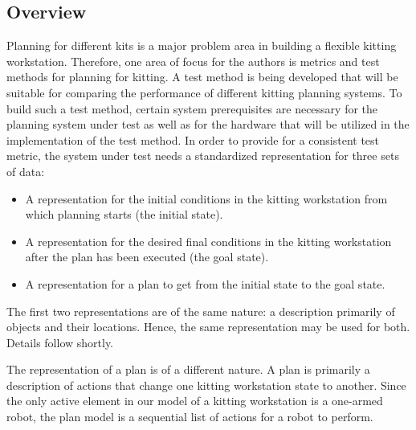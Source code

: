 \subsection{Overview}
Planning for different kits is a major problem area in building a
flexible kitting workstation. Therefore, one area of focus for the
authors is metrics and test methods for planning for
kitting.  A test method is being developed that will be suitable for
comparing the performance of different kitting planning systems.  To build
such a test method, certain system prerequisites are necessary for the planning
system under test as well as for the hardware that will be utilized in
the implementation of the test method.
In order to provide for a consistent test metric, the system under
test needs a standardized representation for three sets of data:
\begin{itemize}
\item A representation for the initial conditions in the kitting workstation
 from which planning starts (the initial state).

\item A representation for the desired final conditions in the kitting
workstation after the plan has been executed (the goal state).

\item A representation for a plan to get from the initial state to the goal
state.
\end{itemize}

The first two representations are of the same nature: a description
primarily of objects and their locations. Hence, the same representation
may be used for both. Details follow shortly.

The representation of a plan is of a different nature. A plan is primarily
a description of actions that change one kitting workstation state to
another. Since the only active element in our model of a kitting
workstation is a one-armed robot, the plan model is a sequential
list of actions for a robot to perform.

